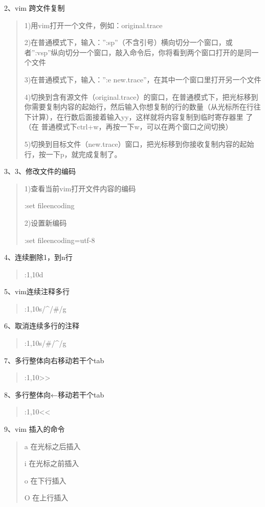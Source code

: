 \documentclass[letterpaper,10pt]{sphinxmanual}
\begin{document}
2、vim 跨文件复制
\begin{quote}

1)用vim打开一个文件，例如：original.trace

2)在普通模式下，输入：'':sp''（不含引号）横向切分一个窗口，或者'':vsp''纵向切分一个窗口，敲入命令后，你将看到两个窗口打开的是同一个文件

3)在普通模式下，输入：'':e new.trace''，在其中一个窗口里打开另一个文件

4)切换到含有源文件（original.trace）的窗口，在普通模式下，把光标移到你需要复制内容的起始行，然后输入你想复制的行的数量（从光标所在行往下计算），在行数后面接着输入yy，这样就将内容复制到临时寄存器里 了（在 普通模式下ctrl+w，再按一下w，可以在两个窗口之间切换）

5)切换到目标文件（new.trace）窗口，把光标移到你接收复制内容的起始行，按一下p，就完成复制了。
\end{quote}

3、3、修改文件的编码
\begin{quote}

1)查看当前vim打开文件内容的编码

:set fileencoding

2)设置新编码

:set fileencoding=utf-8
\end{quote}

4、连续删除1，到n行
\begin{quote}

:1,10d
\end{quote}

5、vim连续注释多行
\begin{quote}

:1,10s/\textasciicircum{}/\#/g
\end{quote}

6、取消连续多行的注释
\begin{quote}

:1,10s/\#/\textasciicircum{}/g
\end{quote}

7、多行整体向右移动若干个tab
\begin{quote}

:1,10\textgreater{}\textgreater{}
\end{quote}

8、多行整体向←移动若干个tab
\begin{quote}

:1,10\textless{}\textless{}
\end{quote}

9、vim 插入的命令
\begin{quote}

a       在光标之后插入

i       在光标之前插入

o       在下行插入

O       在上行插入
\end{quote}
\end{document}
